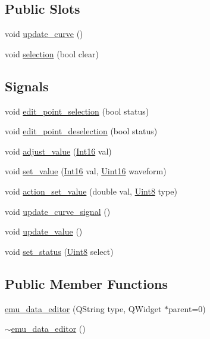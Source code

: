 \subsection*{Public Slots}
\begin{DoxyCompactItemize}
\item 
void \hyperlink{a00004_a15cbcf5f0a17281468800f47898f60c1}{update\+\_\+curve} ()
\item 
void \hyperlink{a00004_a86f994dedec393af88b5d1a37b1e30b5}{selection} (bool clear)
\end{DoxyCompactItemize}
\subsection*{Signals}
\begin{DoxyCompactItemize}
\item 
void \hyperlink{a00004_a9aa2af0c329358fd96f7fb6b7f02bfe1}{edit\+\_\+point\+\_\+selection} (bool status)
\item 
void \hyperlink{a00004_a2b9629d20c2b97c01bf8486c89fd0148}{edit\+\_\+point\+\_\+deselection} (bool status)
\item 
void \hyperlink{a00004_a74d292de22b341313df1852cb1033704}{adjust\+\_\+value} (\hyperlink{a00001_a3985266aecb120f269789241c170850c}{Int16} val)
\item 
void \hyperlink{a00004_a9d26460f253a29dd961b20be0afb5358}{set\+\_\+value} (\hyperlink{a00001_a3985266aecb120f269789241c170850c}{Int16} val, \hyperlink{a00001_aae7407b021d43f7193a81a58cfb3e297}{Uint16} waveform)
\item 
void \hyperlink{a00004_a7c1fa0d7d1623b11d4badceb1854010e}{action\+\_\+set\+\_\+value} (double val, \hyperlink{a00001_a979e3e23b9a449e69ab6a8a83b6042f8}{Uint8} type)
\item 
void \hyperlink{a00004_a7dfbddd62d6782b0f0ce809cbf2338ba}{update\+\_\+curve\+\_\+signal} ()
\item 
void \hyperlink{a00004_ad5f20fdbb4731185020ff4e90cd1ead2}{update\+\_\+value} ()
\item 
void \hyperlink{a00004_a9476424a86a6ed4f84c64d0ac77143cc}{set\+\_\+status} (\hyperlink{a00001_a979e3e23b9a449e69ab6a8a83b6042f8}{Uint8} select)
\end{DoxyCompactItemize}
\subsection*{Public Member Functions}
\begin{DoxyCompactItemize}
\item 
\hyperlink{a00004_ace57d3f7e3dd136290777006218abca9}{emu\+\_\+data\+\_\+editor} (Q\+String type, Q\+Widget $\ast$parent=0)
\item 
\hyperlink{a00004_ab897c9d3081a980c0ad94f09d5dbce99}{$\sim$emu\+\_\+data\+\_\+editor} ()
\end{DoxyCompactItemize}
